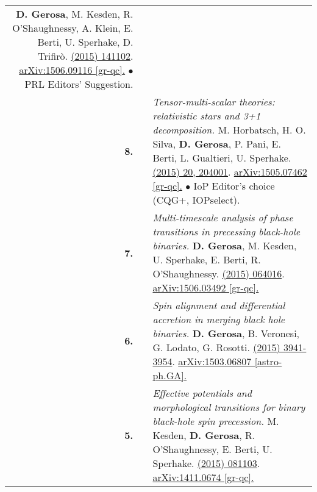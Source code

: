 {\begin{longtable}{rp{0.3cm}p{15.8cm}}
\newline{}
\textbf{D. Gerosa}, M. Kesden, R. O'Shaughnessy, A. Klein, E. Berti, U. Sperhake, D. Trifir\`o.
\newline{}
\href{http://dx.doi.org/10.1103/PhysRevLett.115.141102}{\prl 115 (2015) 141102}. \href{https://arxiv.org/abs/1506.09116}{arXiv:1506.09116 [gr-qc].}
\newline{}
\textcolor{color1}{$\bullet$} PRL Editors' Suggestion.
\vspace{0.09cm}\\
%
\textbf{8.} & & \textit{Tensor-multi-scalar theories: relativistic stars and 3+1 decomposition.}
\newline{}
M. Horbatsch, H. O. Silva, \textbf{D. Gerosa}, P. Pani,  E. Berti, L. Gualtieri, U. Sperhake.
\newline{}
\href{http://dx.doi.org/10.1088/0264-9381/32/20/204001}{\cqg 32 (2015) 20, 204001}. \href{https://arxiv.org/abs/1505.07462}{arXiv:1505.07462 [gr-qc].}
\newline{}
\textcolor{color1}{$\bullet$} IoP Editor's choice (CQG+, IOPselect).
\vspace{0.09cm}\\
%
\textbf{7.} & & \textit{Multi-timescale analysis of phase transitions in precessing black-hole binaries.}
\newline{}
\textbf{D. Gerosa}, M. Kesden, U. Sperhake, E. Berti, R. O'Shaughnessy.
\newline{}
\href{http://dx.doi.org/10.1103/PhysRevD.92.064016}{\prd 92 (2015) 064016}. \href{https://arxiv.org/abs/1506.03492}{arXiv:1506.03492 [gr-qc].}
\vspace{0.09cm}\\
%
\textbf{6.} & & \textit{Spin alignment and differential accretion in merging black hole binaries.}
\newline{}
\textbf{D. Gerosa}, B. Veronesi, G. Lodato, G. Rosotti.
\newline{}
\href{http://dx.doi.org/10.1093/mnras/stv1214}{\mnras 451 (2015) 3941-3954}. \href{https://arxiv.org/abs/1503.06807}{arXiv:1503.06807 [astro-ph.GA].}
\vspace{0.09cm}\\
%
\textbf{5.} & & \textit{Effective potentials and morphological transitions for binary black-hole spin precession.}
\newline{}
M. Kesden, \textbf{D. Gerosa}, R. O'Shaughnessy, E. Berti, U. Sperhake.
\newline{}
\href{http://dx.doi.org/10.1103/PhysRevLett.114.081103}{\prl 114 (2015) 081103}. \href{https://arxiv.org/abs/1411.0674}{arXiv:1411.0674 [gr-qc].}

\end{longtable}}

